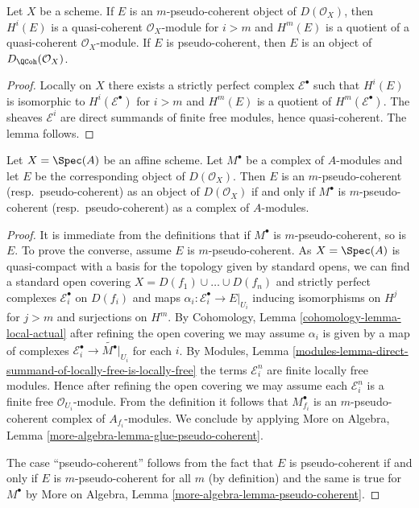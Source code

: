 \begin{lemma}
\label{lemma-pseudo-coherent}
Let $X$ be a scheme. If $E$ is an $m$-pseudo-coherent
object of $D(\mathcal{O}_X)$, then $H^i(E)$ is a quasi-coherent
$\mathcal{O}_X$-module for $i > m$ and $H^m(E)$ is a quotient
of a quasi-coherent $\mathcal{O}_X$-module.
If $E$ is pseudo-coherent, then $E$ is an object of
$D_\QCoh(\mathcal{O}_X)$.
\end{lemma}

\begin{proof}
Locally on $X$ there exists a strictly perfect complex $\mathcal{E}^\bullet$
such that $H^i(E)$ is isomorphic to $H^i(\mathcal{E}^\bullet)$ for $i > m$
and $H^m(E)$ is a quotient of $H^m(\mathcal{E}^\bullet)$. The sheaves
$\mathcal{E}^i$ are direct summands of finite free modules,
hence quasi-coherent. The lemma follows.
\end{proof}

\begin{lemma}
\label{lemma-pseudo-coherent-affine}
Let $X = \Spec(A)$ be an affine scheme. Let $M^\bullet$ be a
complex of $A$-modules and let $E$ be the corresponding object
of $D(\mathcal{O}_X)$. Then $E$ is an $m$-pseudo-coherent
(resp.\ pseudo-coherent) as an object of $D(\mathcal{O}_X)$
if and only if $M^\bullet$ is $m$-pseudo-coherent (resp.\ pseudo-coherent)
as a complex of $A$-modules.
\end{lemma}

\begin{proof}
It is immediate from the definitions that if $M^\bullet$ is
$m$-pseudo-coherent, so is $E$. To prove the converse, assume
$E$ is $m$-pseudo-coherent. As $X = \Spec(A)$ is quasi-compact with
a basis for the topology given by standard opens, we can find a standard
open covering $X = D(f_1) \cup \ldots \cup D(f_n)$ and strictly
perfect complexes $\mathcal{E}_i^\bullet$ on $D(f_i)$ and
maps $\alpha_i : \mathcal{E}_i^\bullet \to E|_{U_i}$ inducing
isomorphisms on $H^j$ for $j > m$ and surjections on $H^m$.
By Cohomology, Lemma \ref{cohomology-lemma-local-actual}
after refining the open covering
we may assume $\alpha_i$ is given by a map of complexes
$\mathcal{E}_i^\bullet \to \widetilde{M^\bullet}|_{U_i}$
for each $i$. By Modules, Lemma
\ref{modules-lemma-direct-summand-of-locally-free-is-locally-free}
the terms $\mathcal{E}_i^n$ are finite locally free modules.
Hence after refining the open covering we may assume each
$\mathcal{E}_i^n$ is a finite free $\mathcal{O}_{U_i}$-module.
From the definition it follows that $M^\bullet_{f_i}$ is
an $m$-pseudo-coherent complex of $A_{f_i}$-modules.
We conclude by applying
More on Algebra, Lemma \ref{more-algebra-lemma-glue-pseudo-coherent}.

\medskip\noindent
The case ``pseudo-coherent'' follows from the fact that $E$ is
pseudo-coherent if and only if $E$ is $m$-pseudo-coherent for
all $m$ (by definition) and the same is true for $M^\bullet$
by More on Algebra, Lemma \ref{more-algebra-lemma-pseudo-coherent}.
\end{proof}

